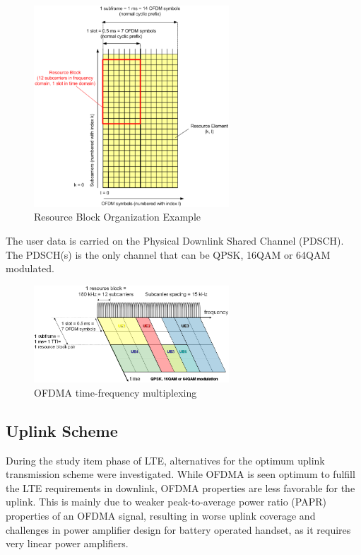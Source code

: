 \begin{figure}[htbp]
    \centering
    \includegraphics[width=0.65\textwidth]{./figures/ofdm_resource_block}
    \caption{ Resource Block Organization Example
    \label{fig:ofdmresblk}}
\end{figure}

The user data is carried on the Physical Downlink Shared Channel (PDSCH). The
PDSCH(s) is the only channel that can be QPSK, 16QAM or 64QAM modulated.

\begin{figure}[htbp]
    \centering
    \includegraphics[width=0.65\textwidth]{./figures/downlink_channels}
    \caption{ OFDMA time-frequency multiplexing
    \label{fig:ad9361diginterface}}
\end{figure}

\subsection{Uplink Scheme}

During the study item phase of LTE, alternatives for the optimum uplink transmission
scheme were investigated. While OFDMA is seen optimum to fulfill the LTE
requirements in downlink, OFDMA properties are less favorable for the uplink. This is
mainly due to weaker peak-to-average power ratio (PAPR) properties of an OFDMA
signal, resulting in worse uplink coverage and challenges in power amplifier design for
battery operated handset, as it requires very linear power amplifiers.\\

